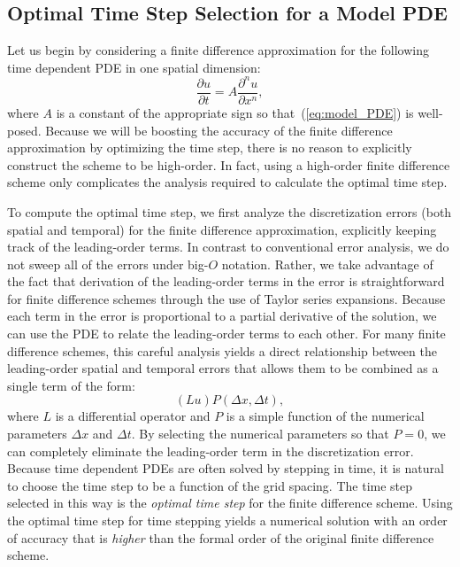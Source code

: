 \documentclass[fleqn,12pt,twoside]{article}
\newcommand{\beq}{\begin{equation}}
\newcommand{\eeq}{\end{equation}}
\def\dt{\Delta t}
\def\dx{\Delta x}
\begin{document}
\subsection{\label{sec:ots_model_pde} 
            Optimal Time Step Selection for a Model PDE}
Let us begin by considering a finite difference approximation for the
following time dependent PDE in one spatial dimension: 
\beq
  \frac{\partial u}{\partial t} = A \frac{\partial^n u}{\partial x^n},
  \label{eq:model_PDE}
\eeq
where $A$ is a constant of the appropriate sign so that~(\ref{eq:model_PDE}) 
is well-posed.  Because we will be boosting the accuracy of the finite 
difference approximation by optimizing the time step, there is no reason to 
explicitly construct the scheme to be high-order.  In fact, using a high-order 
finite difference scheme only complicates the analysis required to calculate 
the optimal time step.  

To compute the optimal time step, we first analyze the discretization errors 
(both spatial and temporal) for the finite difference approximation, 
explicitly keeping track of the leading-order terms.  In contrast to 
conventional error analysis, we do not sweep all of the errors under big-$O$
notation.  Rather, we take advantage of the fact that derivation of the 
leading-order terms in the error is straightforward for finite difference
schemes through the use of Taylor series expansions.  Because each term in 
the error is proportional to a partial derivative of the solution, we can 
use the PDE to relate the leading-order terms to each other.  
For many finite difference schemes, this careful analysis yields a direct 
relationship between the leading-order spatial and temporal errors that allows 
them to be combined as a single term of the form:
\beq
  (L u) P(\dx, \dt) ,
  \label{eq:leading_order_error_model_PDE_general}
\eeq
where $L$ is a differential operator and $P$ is a simple function of the 
numerical parameters $\dx$ and $\dt$.  By selecting the numerical parameters 
so that $P = 0$, we can completely eliminate the leading-order term in the 
discretization error.  Because time dependent PDEs are often solved by 
stepping in time, it is natural to choose the time step to be a function of 
the grid spacing.  The time step selected in this way is the
\emph{optimal time step} for the finite difference scheme.  Using the optimal
time step for time stepping yields a numerical solution with an order 
of accuracy that is \emph{higher} than the formal order of the original finite 
difference scheme.
\end{document}
